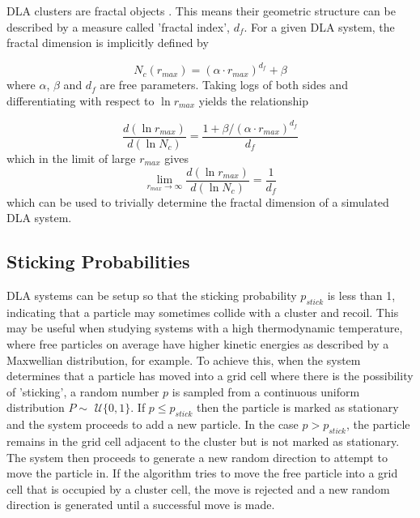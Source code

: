 \documentclass[11pt]{iopart}
\begin{document}
DLA clusters are fractal objects \cite{dla}. This means their geometric structure can be described by a measure called 'fractal index', $d_f$. For a given DLA system, the fractal dimension is implicitly defined by \cite{handout}

\begin{equation}
N_c(r_{max}) = (\alpha \cdot r_{max})^{d_f} + \beta
\end{equation} 
where $\alpha$, $\beta$ and $d_f$ are free parameters.
Taking logs of both sides and differentiating with respect to $\ln r_{max}$ yields the relationship

\begin{equation}
\frac{d(\ln r_{max})}{d(\ln N_c)} = \frac{1 + \beta/(\alpha \cdot r_{max})^{d_f}}{d_f}
\end{equation} 
which in the limit of large $r_{max}$ gives
\begin{equation}
\label{dflogequation}
\lim_{r_{max}\to\infty} \frac{d(\ln r_{max})}{d(\ln N_c)}  = \frac{1}{d_f}
\end{equation}
which can be used to trivially determine the fractal dimension of a simulated DLA system.

\subsection{Sticking Probabilities}

DLA systems can be setup so that the sticking probability $p_{stick}$ is less than 1, indicating that a particle may sometimes collide with a cluster and recoil. This may be useful when studying systems with a high thermodynamic temperature, where free particles on average have higher kinetic energies as described by a Maxwellian distribution, for example. To achieve this, when the system determines that a particle has moved into a grid cell where there is the possibility of 'sticking', a random number $p$ is sampled from a continuous uniform distribution $P \sim$ $\mathcal{U}\{0, 1\}$. If $p \leq p_{stick}$ then the particle is marked as stationary and the system proceeds to add a new particle. In the case $p > p_{stick}$, the particle remains in the grid cell adjacent to the cluster but is not marked as stationary. The system then proceeds to generate a new random direction to attempt to move the particle in. If the algorithm tries to move the free particle into a grid cell that is occupied by a cluster cell, the move is rejected and a new random direction is generated until a successful move is made.
\end{document}
